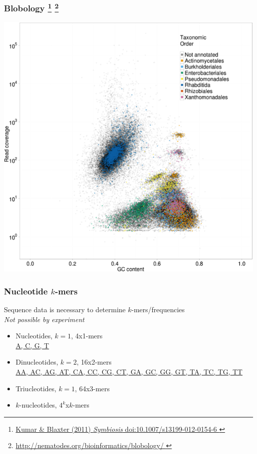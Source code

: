 %
\begin{frame}
  \frametitle{Blobology
  \footnote{\tiny{\href{http://dx.doi.org/10.1007/s13199-012-0154-6
}{Kumar \& Blaxter (2011) \textit{Symbiosis} doi:10.1007/s13199-012-0154-6
}}}
  \footnote{\tiny{\href{http://nematodes.org/bioinformatics/blobology/
}{http://nematodes.org/bioinformatics/blobology/
}}}  
  }
  \begin{center}
    \includegraphics[height=0.7\textheight]{images/blobology}
  \end{center}
\end{frame}

%
\begin{frame}
  \frametitle{Nucleotide $k$-mers}
  Sequence data is necessary to determine $k$-mers/frequencies \\
  \textit{Not possible by experiment}
  \begin{itemize}
    \item \textcolor{hutton_green}{Nucleotides, $k=1$, 4x1-mers} \\
      \url{A, C, G, T}
    \item \textcolor{hutton_blue}{Dinucleotides, $k=2$, 16x2-mers} \\
      \url{AA, AC, AG, AT, CA, CC, CG, CT, GA, GC, GG, GT, TA, TC, TG, TT}
    \item \textcolor{RawSienna}{Triucleotides, $k=1$, 64x3-mers}
    \item \textcolor{hutton_purple}{$k$-nucleotides, $4^k$x$k$-mers}
  \end{itemize}  
\end{frame}


